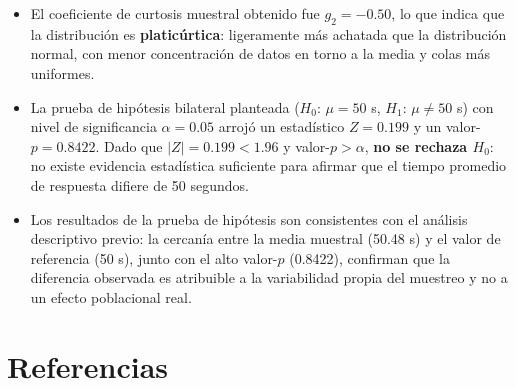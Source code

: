 \documentclass[12pt,letterpaper]{article}
\begin{document}
\begin{itemize}[leftmargin=1.2cm]
    \item El coeficiente de curtosis muestral obtenido fue $g_2 = -0.50$, lo que
          indica que la distribución es \textbf{platicúrtica}: ligeramente más achatada
          que la distribución normal, con menor concentración de datos en torno a la
          media y colas más uniformes.

    \item La prueba de hipótesis bilateral planteada ($H_0$: $\mu = 50$ s,
          $H_1$: $\mu \neq 50$ s) con nivel de significancia $\alpha = 0.05$ arrojó
          un estadístico $Z = 0.199$ y un valor-$p = 0.8422$. Dado que
          $|Z| = 0.199 < 1.96$ y valor-$p > \alpha$, \textbf{no se rechaza $H_0$}:
          no existe evidencia estadística suficiente para afirmar que el tiempo
          promedio de respuesta difiere de 50 segundos.

    \item Los resultados de la prueba de hipótesis son consistentes con el análisis
          descriptivo previo: la cercanía entre la media muestral (50.48 s) y el valor
          de referencia (50 s), junto con el alto valor-$p$ (0.8422), confirman que
          la diferencia observada es atribuible a la variabilidad propia del muestreo
          y no a un efecto poblacional real.
\end{itemize}

\section{Referencias}
\end{document}
